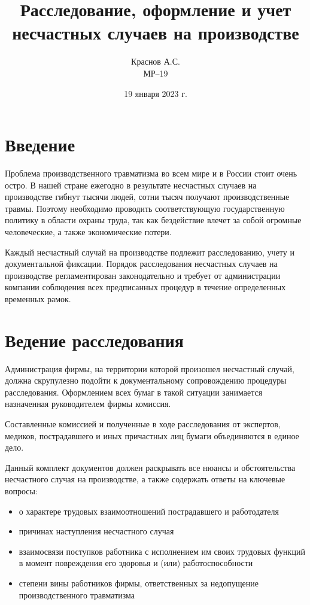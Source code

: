 \title{Расследование, оформление и учет несчастных случаев на производстве}
\author{Краснов А.С.\\МР--19}
\date{19 января 2023 г.}
\maketitlepage

\section{Введение}
Проблема производственного травматизма во всем мире и в России стоит очень остро. В нашей стране ежегодно в результате несчастных случаев на производстве гибнут тысячи людей, сотни тысяч получают производственные травмы. Поэтому необходимо проводить соответствующую государственную политику в области охраны труда, так как бездействие влечет за собой огромные человеческие, а также экономические потери.


Каждый несчастный случай на производстве подлежит расследованию, учету и документальной фиксации. Порядок расследования несчастных случаев на производстве регламентирован законодательно и требует от администрации компании соблюдения всех предписанных процедур в течение определенных временных рамок.


\section{Ведение расследования}
Администрация фирмы, на территории которой произошел несчастный случай, должна скрупулезно подойти к документальному сопровождению процедуры расследования. Оформлением всех бумаг в такой ситуации занимается назначенная руководителем фирмы комиссия.


Составленные комиссией и полученные в ходе расследования от экспертов, медиков, пострадавшего и иных причастных лиц бумаги объединяются в единое дело.

Данный комплект документов должен раскрывать все нюансы и обстоятельства несчастного случая на производстве, а также содержать ответы на ключевые вопросы:
\begin{itemize}
    \item о характере трудовых взаимоотношений пострадавшего и работодателя
    \item причинах наступления несчастного случая
    \item взаимосвязи поступков работника с исполнением им своих трудовых функций в момент повреждения его здоровья и (или) работоспособности
    \item степени вины работников фирмы, ответственных за недопущение производственного травматизма
\end{itemize}


